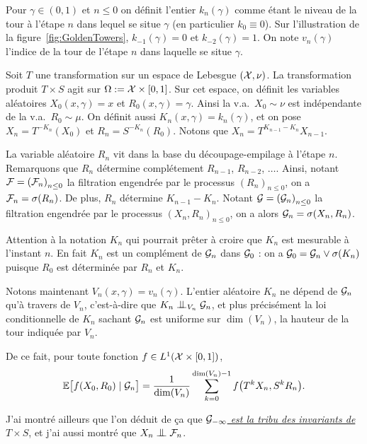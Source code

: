 \documentclass[12pt,a4paper]{article}
\begin{document}
Pour $\gamma \in (0,1)$ et $n \leq 0$ on définit l'entier 
$k_n(\gamma)$ comme étant le niveau de la tour à l'étape $n$ 
dans lequel se situe $\gamma$ (en particulier $k_0 \equiv 0$). 
Sur l'illustration de la figure~\ref{fig:GoldenTowers}, 
$k_{-1}(\gamma) = 0$ et $k_{-2}(\gamma)=1$. 
On note $v_n(\gamma)$ l'indice de la tour de l'étape $n$ dans laquelle 
se situe $\gamma$.

Soit $T$ une transformation sur un espace de Lebesgue 
$(\mathcal{X}, \nu)$. La transformation produit $T \times S$ 
agit sur $\Omega := \mathcal{X} \times [0,1]$. 
Sur cet espace, on définit les variables aléatoires 
$X_0(x, \gamma)=x$ et $R_0(x, \gamma)=\gamma$. 
Ainsi la v.a.\ $X_0 \sim \nu$ est indépendante de la v.a.\ $R_0 \sim \mu$. 
On définit aussi $K_n(x,\gamma)=k_n(\gamma)$, et on 
pose $\boxed{X_n = T^{-K_n}(X_0)}$ et 
$\boxed{R_n = S^{-K_n}(R_0)}$. 
Notons que $X_n = T^{K_{n-1}-K_n}X_{n-1}$. 

La variable aléatoire $R_n$ vit dans la base du découpage-empilage 
à l'étape $n$. 
Remarquons que $R_n$ détermine complétement $R_{n-1}$, $R_{n-2}$, $\ldots$. 
Ainsi, notant $\mathcal{F}={(\mathcal{F}_n)}_{n \leq 0}$ la filtration engendrée 
par le processus ${(R_n)}_{n \leq 0}$, on a 
$\mathcal{F}_n = \sigma(R_n)$. 
 De plus, $R_n$ détermine $K_{n-1}-K_n$. 
Notant $\mathcal{G}={(\mathcal{G}_n)}_{n \leq 0}$ la filtration engendrée 
par le processus ${(X_n,R_n)}_{n \leq 0}$, on a alors
$\mathcal{G}_n = \sigma(X_n, R_n)$. 

Attention à la notation $K_n$ qui pourrait prêter à croire que 
$K_n$ est mesurable à l'instant $n$. 
En fait $K_n$ est un complément de $\mathcal{G}_n$ dans $\mathcal{G}_0$ : 
on a $\mathcal{G}_0 = \mathcal{G}_n \vee \sigma(K_n)$ puisque 
$R_0$ est déterminée par $R_n$ et $K_n$. 

Notons maintenant $V_n(x,\gamma)=v_n(\gamma)$. 
L'entier aléatoire $K_n$ ne dépend de $\mathcal{G}_n$ qu'à travers de 
$V_n$, c'est-à-dire que $K_n \indep_{V_n} \GG_n$, et 
plus précisément la loi conditionnelle de $K_n$ sachant $\mathcal{G}_n$ 
est uniforme sur $\dim(V_n)$, la hauteur de la tour indiquée par $V_n$. 

De ce fait, pour toute fonction $f \in L^1(\mathcal{X} \times [0,1])$, 
\begin{equation}\label{eq:conditionalexpectation}
\mathbb{E}\bigl[f(X_0, R_0) \mid \mathcal{G}_n\bigr]
 =\frac{1}{\dim(V_n)}\sum_{k=0}^{\dim(V_n)-1} f\bigl(T^kX_n, S^kR_n \bigr).
\end{equation}

J'ai montré ailleurs que l'on déduit de ça que 
\uline{\emph{$\mathcal{G}_{-\infty}$ est la tribu des invariants de $T \times S$}}, 
et j'ai aussi montré que $X_n \indep \FF_n$.
\end{document}

